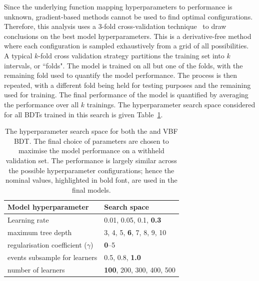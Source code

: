 Since the underlying function mapping hyperparameters to performance is unknown, gradient-based methods cannot be used to find optimal configurations. 
Therefore, this analysis uses a 3-fold cross-validation technique~\cite{patternRecognitionAndML} to draw conclusions on the best model hyperparameters. This is a derivative-free method where each configuration is sampled exhaustively from a grid of all possibilities. A typical $k$-fold cross validation strategy partitions the training set into $k$ intervals, or ``folds".
The model is trained on all but one of the folds, with the remaining fold used to quantify the model performance. The process is then repeated, with a different fold being held for testing purposes and the remaining used for training. The final performance of the model is quantified by averaging the performance over all $k$ trainings. The hyperparameter search space considered for all BDTs trained in this search is given Table~\ref{tab:bdt_hps}.
\begin{table}[htbp!]
\centering
\caption[The hyperparameter search space for the BDTs used in the categorisation of \Hee events]{The hyperparameter search space for both the \ggH and VBF BDT. The final choice of parameters are chosen to maximise the model performance on a withheld validation set. The performance is largely similar across the possible hyperparameter configurations; hence the nominal values, highlighted in bold font, are used in the final models. 
}
\label{tab:bdt_hps}
\begin{tabular}{l|l}
\hline
Model hyperparameter    & Search space \\ \hline 
Learning rate & 0.01, 0.05, 0.1, \textbf{0.3}       \\
maximum tree depth & 3, 4, 5, \textbf{6}, 7, 8, 9, 10\\
regularisation coefficient ($\gamma$) & \textbf{0}--5 \\
events subsample for learners & 0.5, 0.8, \textbf{1.0} \\
number of learners & \textbf{100}, 200, 300, 400, 500 \\ 
\hline
\end{tabular}                  
\end{table}  


